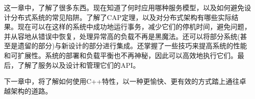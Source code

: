 这一章中，了解了很多东西。现在知道了何时应用哪种服务模型，以及如何避免设计分布式系统的常见陷阱。了解了CAP定理，以及对分布式架构有哪些实际结果。现在可以在这样的系统中成功地运行事务，减少它们的停机时间，避免问题，并从容地从错误中恢复，处理异常高的负载不再是黑魔法。还可以将部分系统(甚至是遗留的部分)与新设计的部分进行集成。还掌握了一些技巧来提高系统的性能和可扩展性。系统的部署和负载平衡也不再神秘，因此可以高效地执行它们。最后，了解了服务以及设计和管理它们的API。

下一章中，将了解如何使用C++特性，以一种更愉快、更有效的方式踏上通往卓越架构的道路。
